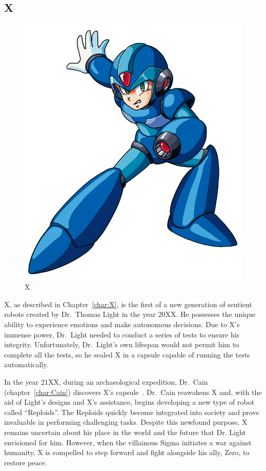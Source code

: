 \subsection{X}
\begin{figure}[htp]
	\centering
	\includegraphics[height=\portraitsize]{figures/X1/X_X1.png}
	\caption{X}
\end{figure}

X, as described in Chapter~\ref{char:X}, is the first of a new generation of sentient robots created by Dr.~Thomas Light in the year 20XX. He possesses the unique ability to experience emotions and make autonomous decisions. Due to X's immense power, Dr.~Light needed to conduct a series of tests to ensure his integrity. Unfortunately, Dr.~Light's own lifespan would not permit him to complete all the tests, so he sealed X in a capsule capable of running the tests automatically.

In the year 21XX, during an archaeological expedition, Dr.~Cain (chapter~\ref{char:Cain}) discovers X's capsule~\cite{X:Manual,wiki:Cain_journal}. Dr.~Cain reawakens X and, with the aid of Light's designs and X's assistance, begins developing a new type of robot called ``Reploids''. The Reploids quickly become integrated into society and prove invaluable in performing challenging tasks. Despite this newfound purpose, X remains uncertain about his place in the world and the future that Dr. Light envisioned for him. However, when the villainous Sigma initiates a war against humanity, X is compelled to step forward and fight alongside his ally, Zero, to restore peace.

